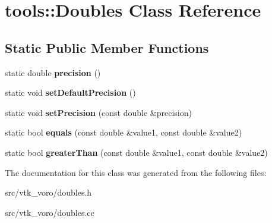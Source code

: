 \hypertarget{classtools_1_1Doubles}{}\section{tools\+:\+:Doubles Class Reference}
\label{classtools_1_1Doubles}
\subsection*{Static Public Member Functions}
\begin{DoxyCompactItemize}
\item 
static double {\bfseries precision} ()\hypertarget{classtools_1_1Doubles_a84e9bc09be0ef2c41c29d075bd02fc71}{}\label{classtools_1_1Doubles_a84e9bc09be0ef2c41c29d075bd02fc71}

\item 
static void {\bfseries set\+Default\+Precision} ()\hypertarget{classtools_1_1Doubles_a0277a8c3a7557ffb0a6ed770ca3cbeb6}{}\label{classtools_1_1Doubles_a0277a8c3a7557ffb0a6ed770ca3cbeb6}

\item 
static void {\bfseries set\+Precision} (const double \&precision)\hypertarget{classtools_1_1Doubles_ae899eff398144198ebd48fb84916b7cb}{}\label{classtools_1_1Doubles_ae899eff398144198ebd48fb84916b7cb}

\item 
static bool {\bfseries equals} (const double \&value1, const double \&value2)\hypertarget{classtools_1_1Doubles_a8ac058427f5fdaa92480400771e9a1be}{}\label{classtools_1_1Doubles_a8ac058427f5fdaa92480400771e9a1be}

\item 
static bool {\bfseries greater\+Than} (const double \&value1, const double \&value2)\hypertarget{classtools_1_1Doubles_aaaf1773f597e2e07a56eb13f995270e2}{}\label{classtools_1_1Doubles_aaaf1773f597e2e07a56eb13f995270e2}

\end{DoxyCompactItemize}


The documentation for this class was generated from the following files\+:\begin{DoxyCompactItemize}
\item 
src/vtk\+\_\+voro/doubles.\+h\item 
src/vtk\+\_\+voro/doubles.\+cc\end{DoxyCompactItemize}
